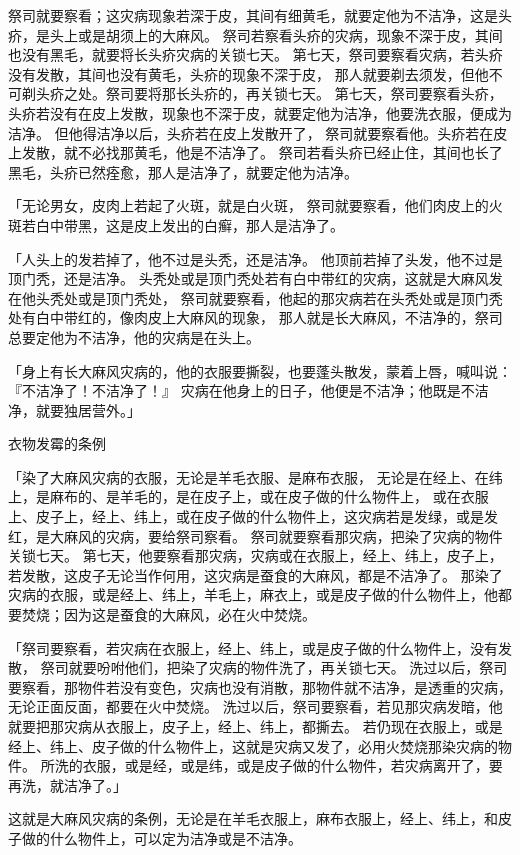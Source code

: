 {祭司就要察看；这灾病现象若深于皮，其间有细黄毛，就要定他为不洁净，这是头疥，是头上或是胡须上的大麻风。
祭司若察看头疥的灾病，现象不深于皮，其间也没有黑毛，就要将长头疥灾病的关锁七天。
第七天，祭司要察看灾病，若头疥没有发散，其间也没有黄毛，头疥的现象不深于皮，
那人就要剃去须发，但他不可剃头疥之处。祭司要将那长头疥的，再关锁七天。
第七天，祭司要察看头疥，头疥若没有在皮上发散，现象也不深于皮，就要定他为洁净，他要洗衣服，便成为洁净。
但他得洁净以后，头疥若在皮上发散开了，
祭司就要察看他。头疥若在皮上发散，就不必找那黄毛，他是不洁净了。
祭司若看头疥已经止住，其间也长了黑毛，头疥已然痊愈，那人是洁净了，就要定他为洁净。
\par }{\PP {}「无论男女，皮肉上若起了火斑，就是白火斑，
祭司就要察看，他们肉皮上的火斑若白中带黑，这是皮上发出的白癣，那人是洁净了。
\par }{\PP {}「人头上的发若掉了，他不过是头秃，还是洁净。
他顶前若掉了头发，他不过是顶门秃，还是洁净。
头秃处或是顶门秃处若有白中带红的灾病，这就是大麻风发在他头秃处或是顶门秃处，
祭司就要察看，他起的那灾病若在头秃处或是顶门秃处有白中带红的，像肉皮上大麻风的现象，
那人就是长大麻风，不洁净的，祭司总要定他为不洁净，他的灾病是在头上。
\par }{\PP {}「身上有长大麻风灾病的，他的衣服要撕裂，也要蓬头散发，蒙着上唇，喊叫说：『不洁净了！不洁净了！』
灾病在他身上的日子，他便是不洁净；他既是不洁净，就要独居营外。」
\par }{\SH 衣物发霉的条例
\par }{\PP {}「染了大麻风灾病的衣服，无论是羊毛衣服、是麻布衣服，
无论是在经上、在纬上，是麻布的、是羊毛的，是在皮子上，或在皮子做的什么物件上，
或在衣服上、皮子上，经上、纬上，或在皮子做的什么物件上，这灾病若是发绿，或是发红，是大麻风的灾病，要给祭司察看。
祭司就要察看那灾病，把染了灾病的物件关锁七天。
第七天，他要察看那灾病，灾病或在衣服上，经上、纬上，皮子上，若发散，这皮子无论当作何用，这灾病是蚕食的大麻风，都是不洁净了。
那染了灾病的衣服，或是经上、纬上，羊毛上，麻衣上，或是皮子做的什么物件上，他都要焚烧；因为这是蚕食的大麻风，必在火中焚烧。
\par }{\PP {}「祭司要察看，若灾病在衣服上，经上、纬上，或是皮子做的什么物件上，没有发散，
祭司就要吩咐他们，把染了灾病的物件洗了，再关锁七天。
洗过以后，祭司要察看，那物件若没有变色，灾病也没有消散，那物件就不洁净，是透重的灾病，无论正面反面，都要在火中焚烧。
洗过以后，祭司要察看，若见那灾病发暗，他就要把那灾病从衣服上，皮子上，经上、纬上，都撕去。
若仍现在衣服上，或是经上、纬上、皮子做的什么物件上，这就是灾病又发了，必用火焚烧那染灾病的物件。
所洗的衣服，或是经，或是纬，或是皮子做的什么物件，若灾病离开了，要再洗，就洁净了。」
\par }{\PP {}这就是大麻风灾病的条例，无论是在羊毛衣服上，麻布衣服上，经上、纬上，和皮子做的什么物件上，可以定为洁净或是不洁净。

}
